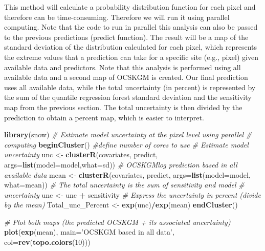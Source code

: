 \documentclass[10pt,b5paper,]{book}
\newenvironment{Shaded}{\begin{snugshade}}{\end{snugshade}}
\newcommand{\CommentTok}[1]{\textcolor[rgb]{0.56,0.35,0.01}{\textit{#1}}}
\newcommand{\DataTypeTok}[1]{\textcolor[rgb]{0.13,0.29,0.53}{#1}}
\newcommand{\DecValTok}[1]{\textcolor[rgb]{0.00,0.00,0.81}{#1}}
\newcommand{\KeywordTok}[1]{\textcolor[rgb]{0.13,0.29,0.53}{\textbf{#1}}}
\newcommand{\NormalTok}[1]{#1}
\newcommand{\OperatorTok}[1]{\textcolor[rgb]{0.81,0.36,0.00}{\textbf{#1}}}
\newcommand{\StringTok}[1]{\textcolor[rgb]{0.31,0.60,0.02}{#1}}
\theoremstyle{definition}
\theoremstyle{definition}
\theoremstyle{definition}
\theoremstyle{remark}
\begin{document}
This method will calculate a probability distribution function for each
pixel and therefore can be time-consuming. Therefore we will run it
using parallel computing. Note that the code to run in parallel this
analysis can also be passed to the previous predictions (predict
function). The result will be a map of the standard deviation of the
distribution calculated for each pixel, which represents the extreme
values that a prediction can take for a specific site (e.g., pixel)
given available data and predictors. Note that this analysis is
performed using all available data and a second map of OCSKGM is
created. Our final prediction uses all available data, while the total
uncertainty (in percent) is represented by the sum of the quantile
regression forest standard deviation and the sensitivity map from the
previous section. The total uncertainty is then divided by the
prediction to obtain a percent map, which is easier to interpret.

\begin{Shaded}
\begin{Highlighting}[]
\KeywordTok{library}\NormalTok{(snow)}
\CommentTok{# Estimate model uncertainty at the pixel level using parallel }
\CommentTok{# computing}
\KeywordTok{beginCluster}\NormalTok{() }\CommentTok{#define number of cores to use}
\CommentTok{# Estimate model uncertainty}
\NormalTok{unc <-}\StringTok{ }\KeywordTok{clusterR}\NormalTok{(covariates, predict, }\DataTypeTok{args=}\KeywordTok{list}\NormalTok{(}\DataTypeTok{model=}\NormalTok{model,}\DataTypeTok{what=}\NormalTok{sd))}
\CommentTok{# OCSKGMlog prediction based in all available data}
\NormalTok{mean <-}\StringTok{ }\KeywordTok{clusterR}\NormalTok{(covariates, predict, }
                 \DataTypeTok{args=}\KeywordTok{list}\NormalTok{(}\DataTypeTok{model=}\NormalTok{model, }\DataTypeTok{what=}\NormalTok{mean))}
\CommentTok{# The total uncertainty is the sum of sensitivity and model }
\CommentTok{# uncertainty}
\NormalTok{unc <-}\StringTok{ }\NormalTok{unc }\OperatorTok{+}\StringTok{ }\NormalTok{sensitivity}
\CommentTok{# Express the uncertainty in percent (divide by the mean)}
\NormalTok{Total_unc_Percent <-}\StringTok{ }\KeywordTok{exp}\NormalTok{(unc)}\OperatorTok{/}\KeywordTok{exp}\NormalTok{(mean)}
\KeywordTok{endCluster}\NormalTok{()}
\end{Highlighting}
\end{Shaded}

\begin{Shaded}
\begin{Highlighting}[]
\CommentTok{# Plot both maps (the predicted OCSKGM + its associated uncertainty)}
\KeywordTok{plot}\NormalTok{(}\KeywordTok{exp}\NormalTok{(mean), }\DataTypeTok{main=}\StringTok{'OCSKGM based in all data'}\NormalTok{, }
     \DataTypeTok{col=}\KeywordTok{rev}\NormalTok{(}\KeywordTok{topo.colors}\NormalTok{(}\DecValTok{10}\NormalTok{)))}
\end{Highlighting}
\end{Shaded}
\end{document}
